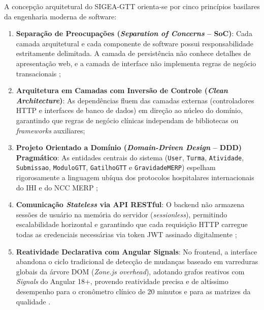 A concepção arquitetural do SIGEA-GTT orienta-se por cinco princípios basilares da engenharia moderna de software:

\begin{enumerate}
    \item \textbf{Separação de Preocupações (\textit{Separation of Concerns} -- SoC)}: Cada camada arquitetural e cada componente de software possui responsabilidade estritamente delimitada. A camada de persistência não conhece detalhes de apresentação web, e a camada de interface não implementa regras de negócio transacionais \cite{martin2018};
    \item \textbf{Arquitetura em Camadas com Inversão de Controle (\textit{Clean Architecture})}: As dependências fluem das camadas externas (controladores HTTP e interfaces de banco de dados) em direção ao núcleo do domínio, garantindo que regras de negócio clínicas independam de bibliotecas ou \textit{frameworks} auxiliares;
    \item \textbf{Projeto Orientado a Domínio (\textit{Domain-Driven Design} -- DDD) Pragmático}: As entidades centrais do sistema (\texttt{User}, \texttt{Turma}, \texttt{Atividade}, \texttt{Submissao}, \texttt{ModuloGTT}, \texttt{GatilhoGTT} e \texttt{GravidadeMERP}) espelham rigorosamente a linguagem ubíqua dos protocolos hospitalares internacionais do IHI e do NCC MERP \cite{evans2003};
    \item \textbf{Comunicação \textit{Stateless} via API RESTful}: O backend não armazena sessões de usuário na memória do servidor (\textit{sessionless}), permitindo escalabilidade horizontal e garantindo que cada requisição HTTP carregue todas as credenciais necessárias via token JWT assinado digitalmente \cite{richards2020};
    \item \textbf{Reatividade Declarativa com Angular Signals}: No frontend, a interface abandona o ciclo tradicional de detecção de mudanças baseado em varreduras globais da árvore DOM (\textit{Zone.js overhead}), adotando grafos reativos com \textit{Signals} do Angular 18+, provendo reatividade precisa e de altíssimo desempenho para o cronômetro clínico de 20 minutos e para as matrizes da qualidade \cite{angular2024}.
\end{enumerate}
